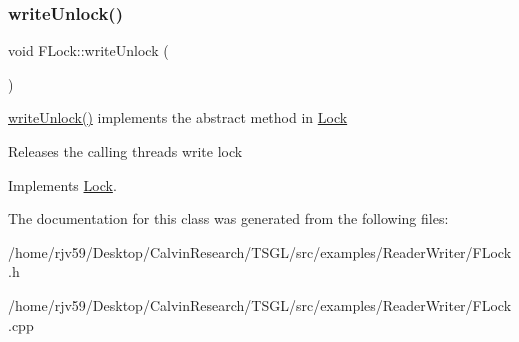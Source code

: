 \mbox{\label{class_f_lock_afb22121c126a71c24e751ae7315e9a48}} 
\subsubsection{\texorpdfstring{write\+Unlock()}{writeUnlock()}}
{\footnotesize\ttfamily void F\+Lock\+::write\+Unlock (\begin{DoxyParamCaption}{ }\end{DoxyParamCaption})\hspace{0.3cm}{\ttfamily [virtual]}}



\hyperlink{class_f_lock_afb22121c126a71c24e751ae7315e9a48}{write\+Unlock()} implements the abstract method in \hyperlink{class_lock}{Lock} 

Releases the calling thread\textquotesingle{}s write lock 

Implements \hyperlink{class_lock}{Lock}.



The documentation for this class was generated from the following files\+:\begin{DoxyCompactItemize}
\item 
/home/rjv59/\+Desktop/\+Calvin\+Research/\+T\+S\+G\+L/src/examples/\+Reader\+Writer/F\+Lock.\+h\item 
/home/rjv59/\+Desktop/\+Calvin\+Research/\+T\+S\+G\+L/src/examples/\+Reader\+Writer/F\+Lock.\+cpp\end{DoxyCompactItemize}
